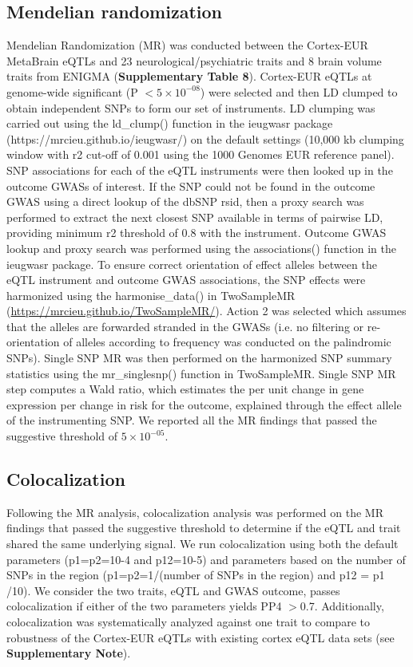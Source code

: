 {{\subsection{Mendelian randomization}
Mendelian Randomization (MR) was conducted between the Cortex-EUR MetaBrain eQTLs and 23 neurological/psychiatric traits and 8 brain volume traits from ENIGMA (\textbf{Supplementary Table 8}). Cortex-EUR eQTLs at genome-wide significant (P $< 5 \times 10^{-08}$) were selected and then LD clumped to obtain independent SNPs to form our set of instruments. LD clumping was carried out using the ld\_clump() function in the ieugwasr package (https://mrcieu.github.io/ieugwasr/) on the default settings (10,000 kb clumping window with r2 cut-off of 0.001 using the 1000 Genomes EUR reference panel). SNP associations for each of the eQTL instruments were then looked up in the outcome GWASs of interest. If the SNP could not be found in the outcome GWAS using a direct lookup of the dbSNP rsid, then a proxy search was performed to extract the next closest SNP available in terms of pairwise LD, providing minimum r2 threshold of 0.8 with the instrument. Outcome GWAS lookup and proxy search was performed using the associations() function in the ieugwasr package. To ensure correct orientation of effect alleles between the eQTL instrument and outcome GWAS associations, the SNP effects were harmonized using the harmonise\_data() in TwoSampleMR (\url{https://mrcieu.github.io/TwoSampleMR/}). Action 2 was selected which assumes that the alleles are forwarded stranded in the GWASs (i.e. no filtering or re-orientation of alleles according to frequency was conducted on the palindromic SNPs). Single SNP MR was then performed on the harmonized SNP summary statistics using the mr\_singlesnp() function in TwoSampleMR. Single SNP MR step computes a Wald ratio, which estimates the per unit change in gene expression per change in risk for the outcome, explained through the effect allele of the instrumenting SNP. We reported all the MR findings that passed the suggestive threshold of $5 \times 10^{-05}$. 

\subsection{Colocalization}
Following the MR analysis, colocalization analysis was performed on the MR findings that passed the suggestive threshold to determine if the eQTL and trait shared the same underlying signal. We run colocalization using both the default parameters (p1=p2=10-4 and p12=10-5) and parameters based on the number of SNPs in the region (p1=p2=1/(number of SNPs in the region) and p12 = p1 /10). We consider the two traits, eQTL and GWAS outcome, passes colocalization if either of the two parameters yields PP4 $>$0.7. Additionally, colocalization was systematically analyzed against one trait to compare to robustness of the Cortex-EUR eQTLs with existing cortex eQTL data sets (see \textbf{Supplementary Note}). 


}}
